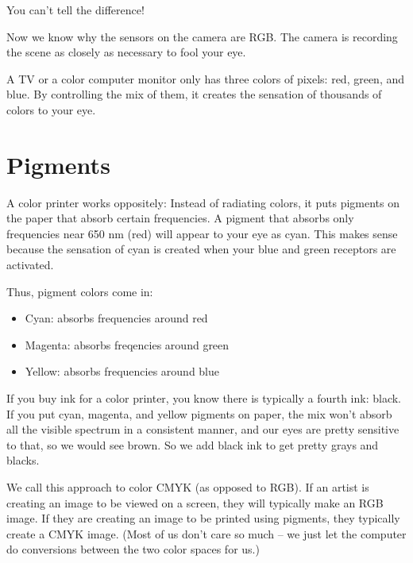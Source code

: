 You can't tell the difference!

Now we know why the sensors on the camera are RGB. The camera is
recording the scene as closely as necessary to fool your eye.

A TV or a color computer monitor only has three colors of pixels: red,
green, and blue.  By controlling the mix of them, it creates the
sensation of thousands of colors to your eye.

\section{Pigments}

A color printer works oppositely: Instead of radiating
colors, it puts pigments on the paper that absorb certain frequencies.
A pigment that absorbs only frequencies near 650 nm (red) will appear
to your eye as cyan. This makes sense because the sensation of cyan is
created when your blue and green receptors are activated.

Thus, pigment colors come in:
\begin{itemize}
\item Cyan: absorbs frequencies around red
\item Magenta: absorbs freqencies around green
\item Yellow: absorbs frequencies around blue
\end{itemize}

If you buy ink for a color printer, you know there is typically a
fourth ink: black. If you put cyan, magenta, and yellow pigments on
paper, the mix won't absorb all the visible spectrum in a consistent
manner, and our eyes are pretty sensitive to that, so we would see
brown. So we add black ink to get pretty grays and blacks.

We call this approach to color CMYK (as opposed to RGB). If an artist
is creating an image to be viewed on a screen, they will typically
make an RGB image.  If they are creating an image to be printed using
pigments, they typically create a CMYK image. (Most of us don't care
so much -- we just let the computer do conversions between the two
color spaces for us.)

